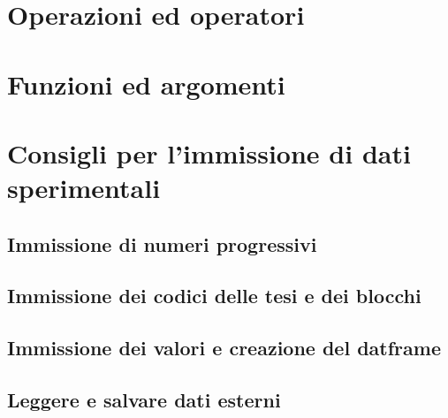 \documentclass[a4paper,12pt,oneside]{book}
\begin{document}
\hypertarget{operazioni-ed-operatori}{%
\section*{Operazioni ed operatori}\label{operazioni-ed-operatori}}

\hypertarget{funzioni-ed-argomenti}{%
\section*{Funzioni ed argomenti}\label{funzioni-ed-argomenti}}

\hypertarget{consigli-per-limmissione-di-dati-sperimentali}{%
\section*{Consigli per l'immissione di dati sperimentali}\label{consigli-per-limmissione-di-dati-sperimentali}}

\hypertarget{immissione-di-numeri-progressivi}{%
\subsection*{Immissione di numeri progressivi}\label{immissione-di-numeri-progressivi}}

\hypertarget{immissione-dei-codici-delle-tesi-e-dei-blocchi}{%
\subsection*{Immissione dei codici delle tesi e dei blocchi}\label{immissione-dei-codici-delle-tesi-e-dei-blocchi}}

\hypertarget{immissione-dei-valori-e-creazione-del-datframe}{%
\subsection*{Immissione dei valori e creazione del datframe}\label{immissione-dei-valori-e-creazione-del-datframe}}

\hypertarget{leggere-e-salvare-dati-esterni}{%
\subsection*{Leggere e salvare dati esterni}\label{leggere-e-salvare-dati-esterni}}
\end{document}
